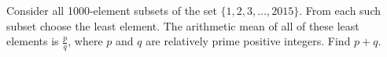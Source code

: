 Consider all 1000-element subsets of the set $\{1,2,3,\dots,2015\}$. From each such subset choose the least element. The arithmetic mean of all of these least elements is $\tfrac{p}{q}$, where $p$ and $q$ are relatively prime positive integers. Find $p+q$.